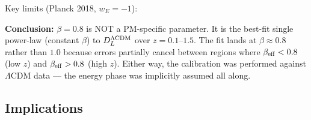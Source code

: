 \documentclass[10pt,twocolumn]{article}
\begin{document}
Key limits (Planck 2018, $w_E=-1$):
\begin{center}
\end{center}

\textbf{Conclusion:} $\beta=0.8$ is NOT a PM-specific parameter.  It is the
best-fit single power-law (constant $\beta$) to $D_L^{\Lambda{\rm CDM}}$ over
$z=0.1$--$1.5$.  The fit lands at $\beta\approx 0.8$ rather than $1.0$ because
errors partially cancel between regions where $\beta_{\rm eff}<0.8$ (low $z$)
and $\beta_{\rm eff}>0.8$ (high $z$).  Either way, the calibration was performed
against $\Lambda$CDM data — the energy phase was implicitly assumed all along.

\subsection*{Implications}
\end{document}
